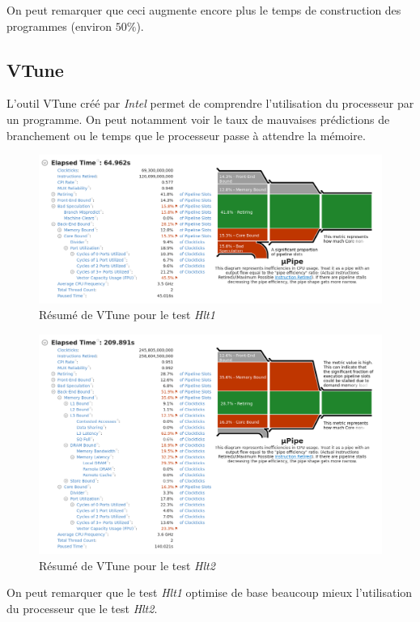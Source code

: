 \documentclass[a4paper]{report}
\begin{document}
On peut remarquer que ceci augmente encore plus le temps de construction des programmes (environ $50\%$).

\subsection{VTune}
L'outil VTune créé par \emph{Intel} permet de comprendre l'utilisation du processeur par un programme.
On peut notamment voir le taux de mauvaises prédictions de branchement ou le temps que le processeur passe à attendre la mémoire.

\begin{figure}[H]
    \includegraphics[width=\textwidth, center]{vtune_hlt1.png}
    \caption{Résumé de VTune pour le test \emph{Hlt1}}
    \label{vtune_hlt1}
\end{figure}

\begin{figure}[H]
    \includegraphics[width=\textwidth, center]{vtune_hlt2.png}
    \caption{Résumé de VTune pour le test \emph{Hlt2}}
    \label{vtune_hlt2}
\end{figure}

On peut remarquer que le test \emph{Hlt1} optimise de base beaucoup mieux l'utilisation du processeur que le test \emph{Hlt2}.
\end{document}
